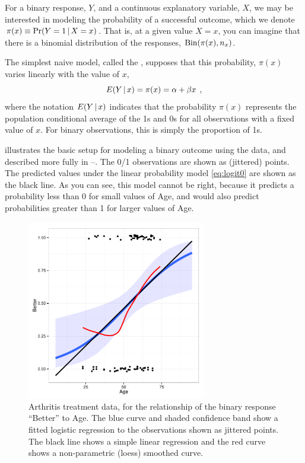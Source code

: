 \documentclass[11pt]{book}\usepackage[]{graphicx}\usepackage[]{color}
\begin{document}
For a binary response, $Y$, and a continuous explanatory variable, $X$,
we may be interested in modeling the probability of a successful
outcome, which we denote $\pi(x) \equiv \Pr(Y=1 \, | \, X=x)$.
That is, at a given value $X = x$, you can imagine that there is a
binomial distribution of the responses, $\Bin( \pi(x), n_x )$.

The simplest naive model, called the ,
supposes that this probability, $\pi (x)$ varies
linearly with the value of $x$,
\begin{equation}\label{eq:logit0}
E ( Y \, | \, x) = \pi(x) =
\alpha + \beta x \:\: ,
\end{equation}
where the notation $E ( Y \, | \, x)$ indicates that the probability $\pi (x)$
represents the population
conditional average of the 1s and 0s for all observations with a fixed value of $x$.
For binary observations, this is simply the proportion of 1s.

 illustrates the basic setup for modeling a binary outcome
using the  data, and described more fully in 
--.
The 0/1 observations are shown as (jittered) points. 
The predicted values under the linear probability model \eqref{eq:logit0} are shown
as the black line.  As you can see, this model cannot be right, because it predicts
a probability less than 0 for small values of Age, and would also predict
probabilities greater than 1 for larger values of Age.

\begin{figure}[!htb]
\centering
\includegraphics[width=0.7\textwidth]{ch07/fig/arthritis-age}
\caption{Arthritis treatment data, for the relationship of the binary response ``Better'' to Age. The blue curve and shaded confidence band show a fitted logistic regression to the observations shown as jittered points. The black line shows a simple linear regression and the red curve shows a non-parametric (loess) smoothed curve.}
\label{fig:arthritis-age}
\end{figure}
\end{document}
